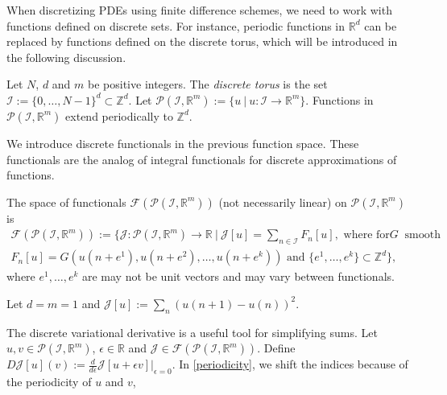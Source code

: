 \documentclass[runningheads]{llncs}
\newcommand{\Rr}{\mathbb{R}}
\newcommand{\Zz}{{\mathbb{Z}}}
\newcommand{\1}{\chi}
\newcommand{\Ii}{\mathcal{I}}
\begin{document}
When discretizing PDEs using finite difference schemes, we need to work with functions defined on discrete sets. For instance, periodic functions in $\Rr^d$ can be replaced by functions defined on the discrete torus, which will be introduced in the following discussion.
\begin{definition}
	\label{d1}
	Let $N$, $d$ and $m$ be positive integers. The \emph{discrete torus} is the set $\Ii:=\{0,\ldots,N-1\}^d\subset \Zz^d$. Let
$
		\mathcal{P}(\Ii,\Rr^m):=\{u\ |\ u:\Ii\rightarrow\Rr^m\}.
$
Functions in $\mathcal{P}(\Ii,\Rr^m)$ extend periodically to $\Zz^d$.
\end{definition}
We introduce discrete functionals in the previous function space. These functionals are the analog of integral functionals for discrete approximations of functions.
\begin{definition}
	\label{d2}
	The space of functionals $\mathcal{F}(\mathcal{P}(\Ii,\Rr^m))$ (not necessarily linear) on $\mathcal{P}(\Ii,\Rr^m)$ is
	\begin{gather*}
		\mathcal{F}(\mathcal{P}(\Ii,\Rr^m)):= \Bigg\{\mathcal{J}:\mathcal{P}(\Ii,\Rr^m)\to \Rr\ \Bigg|\ \mathcal{J}[u]=\sum_{n\in\Ii}F_n[u],\text{ where for} G \ \text{ smooth} \\
		F_n[u]=G(u(n+e^1),u(n+e^2),\ldots,u(n+e^k))
		\text{ and }\{e^1,\ldots,e^k\}\subset\Zz^d
		\Bigg\}, 
	\end{gather*}
where $e^1,\ldots,e^k$ are may not be unit vectors and may vary between functionals.
\end{definition}
\begin{example}
	\label{functional1}
	Let $d=m=1$ and
	$	\mathcal{J}[u]:=\sum_{n}(u(n+1)-u(n))^2$.
\end{example}
The discrete variational derivative is a useful tool for simplifying sums.
Let $u,v\in\mathcal{P}(\Ii,\Rr^m)$, $\epsilon 
\in\Rr$ and $\mathcal{J}\in\mathcal{F}(\mathcal{P}(\Ii,\Rr^m))$. Define
$
	D\mathcal{J}[u](v):=\frac{d}{d\epsilon}\mathcal{J}[u+\epsilon v]\bigg|_{\epsilon=0}.
$
In \eqref{periodicity}, we shift the indices because of the periodicity of $u$ and $v$,
\end{document}
